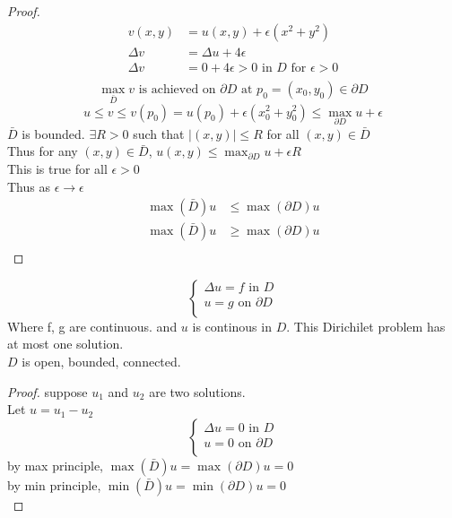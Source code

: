 \documentclass[answers,12pt,addpoints]{exam}
\begin{document}
\begin{proof}
    \begin{align*}
        v(x,y) &= u(x,y) + \epsilon(x^2 + y^2)\\
        \Delta v &= \Delta u + 4\epsilon\\
        \Delta v &= 0 + 4\epsilon > 0 \text{ in } D \text{ for } \epsilon > 0\\
    \end{align*}
    $$\max_{\bar{D}} v \text{ is achieved on } \partial D \text{ at } p_0 = (x_0,y_0) \in \partial D$$
    $$ u \leq v \leq v(p_0) = u(p_0) + \epsilon(x_0^2 + y_0^2) \leq \max_{\partial D} u + \epsilon$$
    $\bar{D} $ is bounded. $\exists R > 0$ such that $|(x,y)| \leq R$ for all $(x,y) \in \bar{D}$\\
    Thus for any $(x,y) \in \bar{D}$, $u(x,y) \leq \max_{\partial D} u + \epsilon R$\\
    This is true for all $\epsilon > 0$\\
    Thus as $\epsilon \to \epsilon$\\
    \begin{align*}
        \max(\bar{D}) u &\leq \max(\partial D) u\\
        \max(\bar{D}) u &\geq \max(\partial D) u\\
    \end{align*}
\end{proof}
\begin{corollary}[Uniqueness]
    $$\begin{cases}
        \Delta u = f \text{ in } D\\
        u = g \text{ on } \partial D\\
    \end{cases}$$
    Where f, g are continuous. and $u$ is continous in $D$. This Dirichilet problem has at most one solution.\\
    $D$ is open, bounded, connected.\\
    \begin{proof}
        suppose $u_1$ and $u_2$ are two solutions.\\
        Let $u = u_1 - u_2$\\
        $$\begin{cases}
            \Delta u = 0 \text{ in } D\\
            u = 0 \text{ on } \partial D\\
        \end{cases}$$
        by max principle, $\max(\bar{D}) u = \max(\partial D) u = 0$\\
        by min principle, $\min(\bar{D}) u = \min(\partial D) u = 0$\\
    \end{proof}
\end{corollary}
\end{document}
